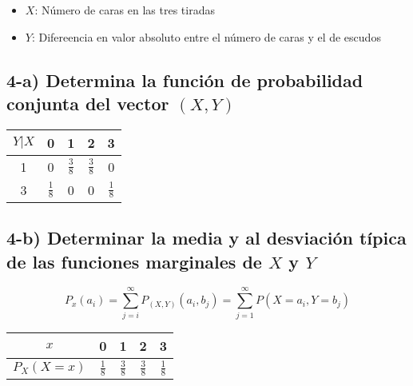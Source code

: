 \documentclass[12pt]{article}
\begin{document}
\begin{itemize}
    \item $X$: N\'umero de caras en las tres tiradas
    \item $Y$: Difereencia en valor absoluto entre el n\'umero de caras y el de escudos
\end{itemize}

\subsection*{4-a) Determina la funci\'on de probabilidad conjunta del vector $\left(X,Y\right)$}


\begin{center}
    \renewcommand{\arraystretch}{1.5}
    \begin{tabular}{|c|c|c|c|c|}
        \hline
        $Y|X$ & 0             & 1               & 2              & 3
        \\
        \hline
        1     & 0             & $  \frac{3}{8}$ & $\frac{3}{8} $ & 0
        \\
        \hline
        3     & $\frac{1}{8}$ & 0               & 0              & $\frac{1}{8}$
        \\
        \hline
    \end{tabular}
\end{center}


\subsection*{4-b) Determinar la media y al desviaci\'on t\'ipica de las funciones marginales  de $X$ y  $Y$ }

\begin{equation*}
    P_x \left(a_i\right) = \sum_{j=i}^{\infty} P_{\left(X,Y\right)}\left(a_i,b_j\right) = \sum_{j=1}^{\infty} P \left(X =a_i , Y = b_j\right)
\end{equation*}


\begin{center}
    \renewcommand{\arraystretch}{1.5}
    \begin{tabular}{|c|c|c|c|c|}
        \hline
        $x$                   & 0             & 1             & 2             & 3
        \\
        \hline
        $P_X\left(X=x\right)$ & $\frac{1}{8}$ & $\frac{3}{8}$ & $\frac{3}{8}$ & $\frac{1}{8}$
        \\
        \hline
    \end{tabular}
\end{center}
\end{document}
